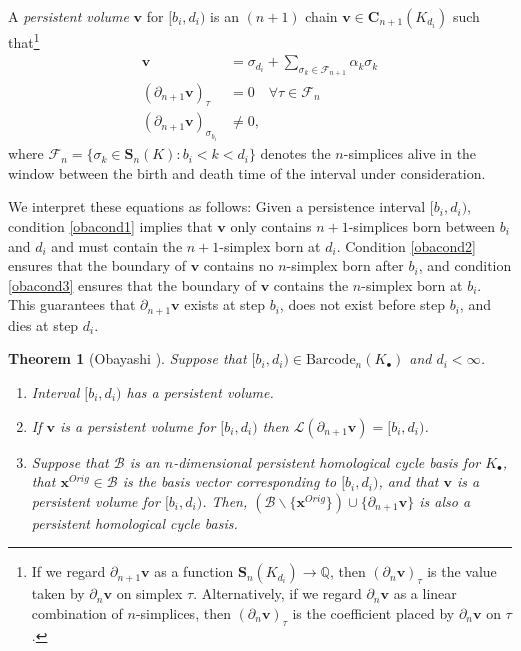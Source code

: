 \documentclass[utf8]{formatting_stuff/frontiersFPHY}
\newcommand{\Q}{\mathbb{Q}}
\newcommand{\Chains}{\mathbf{C}}
\newcommand{\Simplices}[0]{\mathbf{S}}
\newcommand{\originalrep}{\mathbf{x}^{Orig}}
\newcommand{\volvec}{\mathbf{v}}
\newcommand{\barcode}{\mathrm{Barcode}}
\newcommand{\persinterval}{\mathcal{L}}
\newcommand{\hcyclebasis}{\mathcal B}
\theoremstyle{plain}
\newtheorem{theorem}{Theorem}[section]
\theoremstyle{definition}
\begin{document}
A \emph{persistent volume} $\volvec$ for $[b_i, d_i)$ is an $(n+1)$ chain $\volvec \in \Chains_{n+1}(K_{d_i})$ such that\footnote{If we regard $\partial_{n+1}\volvec$ as a function $\Simplices_{n}(K_{d_i}) \to \Q$, then $(\partial_n \volvec)_\tau$ is the value taken by $\partial_n \volvec$ on simplex $\tau$.  Alternatively, if we regard $\partial_n \volvec$ as a linear combination of $n$-simplices, then $(\partial_n \volvec)_\tau$ is the coefficient placed by $\partial_n \volvec$ on $\tau$.}
\begin{align}
    \volvec   & = \sigma_{d_i} + \sum_{\sigma_k \in \mathcal{F}_{n+1}} \alpha_k\sigma_k \label{obacond1} \\
    (\partial_{n+1} \volvec)_\tau  & = 0 \quad \forall \tau \in \mathcal{F}_n \label{obacond2}\\
    (\partial_{n+1} \volvec)_{\sigma_{b_i}}  & \ne 0, \label{obacond3}
\end{align}
where $\mathcal{F}_n = \{\sigma_k \in \Simplices_n(K) : b_i < k < d_i \}$ denotes the $n$-simplices alive in the window between the birth and death time of the interval under consideration.   

We interpret these equations as follows: Given a persistence interval $[b_i,d_i)$, condition \eqref{obacond1} implies that $\volvec$ only contains $n+1$-simplices born between $b_i$ and $d_i$ and must contain the $n+1$-simplex born at $d_i$. Condition \eqref{obacond2} ensures that the boundary of $\volvec$ contains no $n$-simplex born after $b_i$, and condition \eqref{obacond3} ensures that the boundary of $\volvec$ contains the $n$-simplex born at $b_i$. This guarantees that $\partial_{n+1}\volvec$ exists at step $b_i$, does not exist before step $b_i$, and dies at step $d_i$.

%
\begin{theorem}[Obayashi \cite{Obayashi2018}]  
\label{thm:obayashi}
Suppose that $[b_i, d_i) \in \barcode_n(K_\bullet)$ and  $d_i < \infty$.
    \begin{enumerate}
        \item Interval $[b_i, d_i)$ has a persistent volume.
        \item If $\volvec$ is a persistent volume for $[b_i, d_i)$ then $\persinterval(\partial_{n+1}\volvec) = [b_i, d_i)$.
        \item Suppose that $\hcyclebasis$ is an $n$-dimensional persistent homological cycle basis for $K_\bullet$, that $\originalrep \in \hcyclebasis$ is the basis vector corresponding to $[b_i, d_i)$, and that $\volvec$ is a persistent volume for $[b_i, d_i)$.  Then, $(\hcyclebasis \backslash \{\originalrep\}) \cup \{\partial_{n+1}\volvec\} $  
        is also a persistent homological cycle basis.
    \end{enumerate}
\end{theorem}
\end{document}
